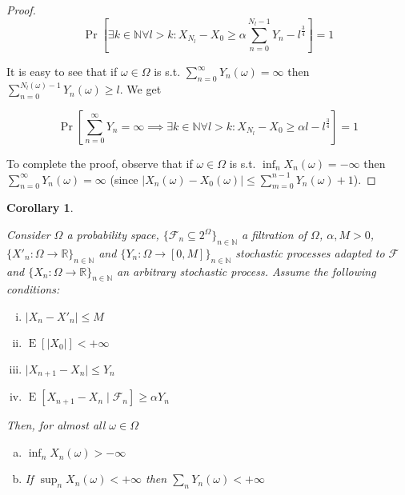 \documentclass[11pt]{article}
\theoremstyle{definition}
\theoremstyle{plain}
\newtheorem{corollary}{Corollary}%
\newcommand{\Nats}{\mathbb{N}}
\newcommand{\Reals}{\mathbb{R}}
\newcommand{\A}[1]{\lvert #1 \rvert}
\newcommand{\Sq}[2]{\{#1\}_{#2 \in \Nats}}
\newcommand{\Sqn}[1]{\Sq{#1}{n}}
\DeclareMathOperator{\E}{E}
\newcommand{\F}{\mathcal{F}}
\begin{document}
\begin{proof}
$$\Pr[\exists k \in \Nats \forall l > k: X_{N_l} - X_0 \geq \alpha \sum_{n=0}^{N_l - 1} Y_n - l^{\frac{3}{4}}] = 1$$


It is easy to see that if $\omega \in \Omega$ is s.t. $\sum_{n=0}^\infty Y_n\left(\omega\right) = \infty$ then $\sum_{n=0}^{N_l\left(\omega\right) - 1} Y_n\left(\omega\right) \geq l$. We get

$$\Pr[\sum_{n=0}^\infty  Y_n = \infty \implies \exists k \in \Nats \forall l > k: X_{N_l} - X_0 \geq \alpha l - l^{\frac{3}{4}}]=1$$

To complete the proof, observe that if ${\omega \in \Omega}$ is s.t. ${\inf_n X_n\left(\omega\right) = -\infty}$ then ${\sum_{n=0}^\infty  Y_n\left(\omega\right) = \infty}$ (since ${\A{X_n\left(\omega\right) - X_0\left(\omega\right)} \leq \sum_{m=0}^{n-1} Y_n\left(\omega\right) + 1}$).
\end{proof}

\begin{samepage}
\begin{corollary}
\label{crl:prudent}

Consider $\Omega$ a probability space, $\Sqn{\F_n \subseteq 2^\Omega}$ a filtration of $\Omega$, $\alpha,M > 0$, $\Sqn{X'_n: \Omega \rightarrow \Reals}$ and $\Sqn{Y_n: \Omega \rightarrow [0,M]}$ stochastic processes adapted to $\F$ and $\Sqn{X_n: \Omega \rightarrow \Reals}$ an arbitrary stochastic process. Assume the following conditions:

\begin{enumerate}[i.]

\item $\A{X_n - X'_n} \leq M$
\item $\E[\A{X_0}] < +\infty$
\item $\A{X_{n+1} - X_n} \leq Y_n$
\item $\E[X_{n+1} - X_n \mid \F_n] \geq \alpha Y_n$

\end{enumerate}

Then, for almost all $\omega \in \Omega$

\begin{enumerate}[a.]

\item\label{itm:crl_prudent__inf} $\inf_n X_n\left(\omega\right) > -\infty$
\item\label{itm:crl_prudent__sup} If $\sup_n X_n\left(\omega\right) < +\infty$ then $\sum_n Y_n\left(\omega\right) < +\infty$

\end{enumerate}

\end{corollary}
\end{samepage}
\end{document}
